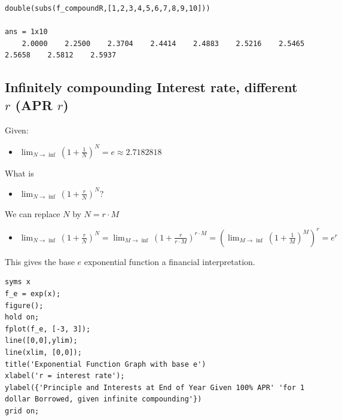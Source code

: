 \documentclass[
]{book}
\providecommand{\tightlist}{%
  \setlength{\itemsep}{0pt}\setlength{\parskip}{0pt}}
\begin{document}
\begin{verbatim}
double(subs(f_compoundR,[1,2,3,4,5,6,7,8,9,10]))

ans = 1x10    
    2.0000    2.2500    2.3704    2.4414    2.4883    2.5216    2.5465    2.5658    2.5812    2.5937
\end{verbatim}

\hypertarget{infinitely-compounding-interest-rate-different-r-apr-r}{%
\subsection{\texorpdfstring{Infinitely compounding Interest rate, different \(r\) (APR \(r\))}{Infinitely compounding Interest rate, different r (APR r)}}\label{infinitely-compounding-interest-rate-different-r-apr-r}}

Given:

\begin{itemize}
\tightlist
\item
  \(\displaystyle \lim_{N\to \inf } (1+\frac{1}{N})^N =e\approx 2.7182818\)
\end{itemize}

What is

\begin{itemize}
\tightlist
\item
  \(\lim_{N\to \inf } (1+\frac{r}{N})^N\)?
\end{itemize}

We can replace \(N\) by \(N=r\cdot M\)

\begin{itemize}
\tightlist
\item
  \(\displaystyle \lim_{N\to \inf } (1+\frac{r}{N})^N =\lim_{M\to \inf } (1+\frac{r}{r\cdot M})^{r\cdot M} ={\left(\lim_{M\to \inf } (1+\frac{1}{M})^M \right)}^r =e^r\)
\end{itemize}

This gives the base \(e\) exponential function a financial interpretation.

\begin{verbatim}
syms x
f_e = exp(x);
figure();
hold on;
fplot(f_e, [-3, 3]);
line([0,0],ylim);
line(xlim, [0,0]);
title('Exponential Function Graph with base e')
xlabel('r = interest rate');
ylabel({'Principle and Interests at End of Year Given 100% APR' 'for 1 dollar Borrowed, given infinite compounding'})
grid on;
\end{verbatim}
\end{document}
